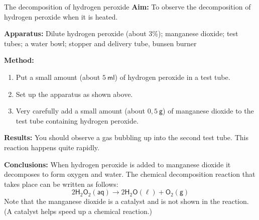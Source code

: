             \begin{g_experiment}{The decomposition of hydrogen peroxide}
            \nopagebreak
            \label{m38709*id63175}\noindent{}\textbf{Aim:}\newline
    To observe the decomposition of hydrogen peroxide when it is heated.\par 
        \label{m38709*id63194}\noindent{}\textbf{Apparatus:}\newline
    Dilute hydrogen peroxide (about 3\%); manganese dioxide; test tubes; a water bowl; stopper and delivery tube, bunsen burner\par 
        \label{m38709*eip-470}
	\par
      \label{m38709*id63199}
    \setcounter{subfigure}{0}
	\begin{figure}[H] %
    \begin{center}
    \end{center}
 \end{figure}       
        \par 
        \label{m38709*id63206}\noindent{}\textbf{Method:}\label{m38709*id63212}\begin{enumerate}[noitemsep, label=\textbf{\arabic*}. ] 
            \label{m38709*uid11}\item Put a small amount (about $5~\mathsf{ml}$) of hydrogen peroxide in a test tube.
\label{m38709*uid12}\item Set up the apparatus as shown above.
\label{m38709*uid13}\item Very carefully add a small amount (about $0,5~\mathsf{g}$) of manganese dioxide to the test tube containing hydrogen peroxide. 
\end{enumerate}
        \par 
        \label{m38709*id63254}\noindent{}\textbf{Results:}\newline
    You should observe a gas bubbling up into the second test tube. This reaction happens quite rapidly. \par 
        \label{m38709*id63302}\noindent{}\textbf{Conclusions:}\newline
    When hydrogen peroxide is added to manganese dioxide it decomposes to form oxygen and water. The chemical decomposition reaction that takes place can be written as follows:
        \label{m38709*id63313}\nopagebreak\noindent{}
    \begin{equation*}
    2{\mathsf{H}}_{2}{\mathsf{O}}_{2} \mathsf{(aq)} \to 2\mathsf{H}_{2}\mathsf{O}\mathsf{(\ell)}+{\mathsf{O}}_{2}\mathsf{(g)}
      \end{equation*}
Note that the manganese dioxide is a catalyst and is not shown in the reaction. (A catalyst helps speed up a chemical reaction.)    \par 
\end{g_experiment}
